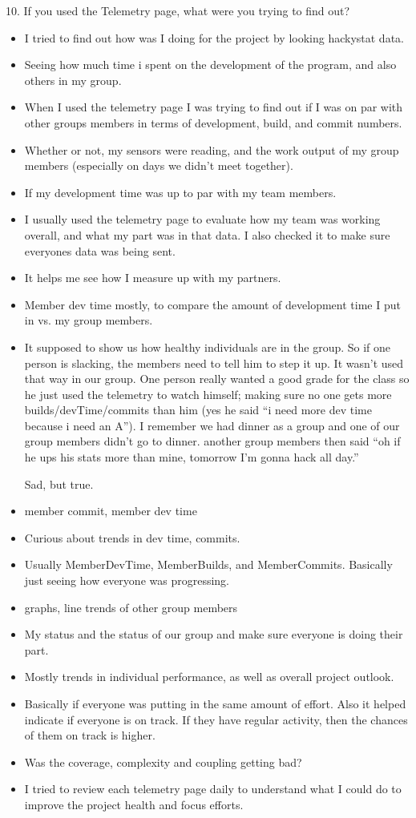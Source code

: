 10. If you used the Telemetry page, what were you trying to find out? 
\begin{itemize}
\item I tried to find out how was I doing for the project by looking hackystat data. 
\item Seeing how much time i spent on the development of the program, and also others in my group.  
\item When I used the telemetry page I was trying to find out if I was on par with other groups members in terms of development, build, and commit numbers.
\item Whether or not, my sensors were reading, and the work output of my group members (especially on days we didn't meet together).
\item If my development time was up to par with my team members.
\item I usually used the telemetry page to evaluate how my team was working overall, and what my part was in that data. I also checked it to make sure everyones data was being sent.
\item It helps me see how I measure up with my partners.
\item Member dev time mostly, to compare the amount of development time I put in vs. my group members.
\item It supposed to show us how healthy individuals are in the group. So if one person is slacking, the members need to tell him to step it up.  It wasn't used that way in our group.  One person really wanted a good grade for the class so he just used the telemetry to watch himself; making sure no one gets more builds/devTime/commits than him (yes he said ``i need more dev time because i need an A'').  I remember we had dinner as a group and one of our group members didn't go to dinner.  another group members then said ``oh if he ups his stats more than mine, tomorrow I'm gonna hack all day.''

Sad, but true.
\item member commit, member dev time
\item Curious about trends in dev time, commits.
\item Usually MemberDevTime, MemberBuilds, and MemberCommits.  Basically just seeing how everyone was progressing.
\item graphs, line trends of other group members
\item My status and the status of our group and make sure everyone is doing their part.
\item Mostly trends in individual performance, as well as overall project outlook.
\item Basically if everyone was putting in the same amount of effort.  Also it helped indicate if everyone is on track.  If they have regular activity, then the chances of them on track is higher.  
\item Was the coverage, complexity and coupling getting bad?
\item I tried to review each telemetry page daily to understand what I could do to improve the project health and focus efforts.
\end{itemize}

